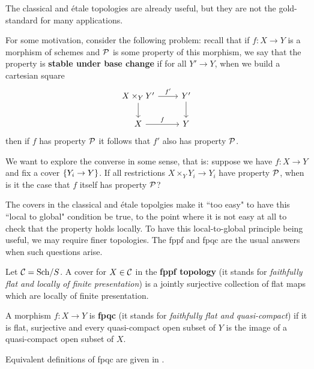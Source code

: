 The classical and \'etale topologies are already useful, but they are not the gold-standard for many applications.

For some motivation, consider the following problem: recall that if $f:X\to Y$ is a morphism of schemes and $\mathcal{P}$ is some property of this morphism, we say that the property is \textbf{stable under base change} if for all $Y'\to Y$, when we build a cartesian square
\[\begin{tikzcd}
	{X\times_YY'} & {Y'} \\
	X & Y
	\arrow["{f'}", from=1-1, to=1-2]
	\arrow[from=1-1, to=2-1]
	\arrow[from=1-2, to=2-2]
	\arrow["f", from=2-1, to=2-2]
\end{tikzcd}\]
then if $f$ has property $\mathcal{P}$ it follows that $f'$ also has property $\mathcal{P}$.

We want to explore the converse in some sense, that is: suppose we have $f:X\to Y$ and fix a cover $\left\{{Y_i\to Y}\right\}$. If all restrictions $X\times_YY_i\to Y_i$ have property $\mathcal{P}$, when is it the case that $f$ itself has property $\mathcal{P}$?


The covers in the classical and \'etale topolgies make it ``too easy" to have this ``local to global" condition be true, to the point where it is not easy at all to check that the property holds locally. To have this local-to-global principle being useful, we may require finer topologies. The fppf and fpqc are the usual answers when such questions arise.

\begin{definition}
Let $\mathcal{C}=\mathrm{Sch}/S$. A cover for $X\in \mathcal{C}$ in the \textbf{fppf topology} (it stands for \textit{faithfully flat and locally of finite presentation}) is a jointly surjective collection of flat maps which are locally of finite presentation. 
\end{definition}

\begin{definition}
A morphism $f:X\to Y$ is \textbf{fpqc} (it stands for \textit{faithfully flat and quasi-compact}) if it is flat, surjective and every quasi-compact open subset of $Y$ is the image of a quasi-compact open subset of $X$.
\end{definition}

\begin{remark}
Equivalent definitions of fpqc are given in \cite{vistoli2007notesgrothendiecktopologiesfibered}.
\end{remark}


